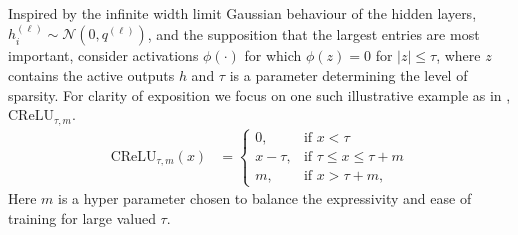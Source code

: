 \documentclass{article}
\theoremstyle{plain}
\theoremstyle{definition}
\theoremstyle{remark}
\begin{document}


Inspired by the infinite width limit Gaussian behaviour of the hidden layers, $h_i^{(\ell)} \sim \mathcal{N} \left( 0, q^{(\ell)} \right)$, and the supposition that the largest entries are most important, consider activations $\phi \left( \cdot \right)$ for which $\phi \left( z \right) = 0$ for $|z| \leq \tau$, where $z$ contains the active outputs $h$ and $\tau$ is a parameter determining the level of sparsity. For clarity of exposition we focus on one such illustrative example as in \cite{price_deep_2023}, $\text{CReLU}_{\tau, m}$. 
\begin{align}
\label{crelu_eq}
            \text{CReLU}_{\tau, m}(x) &=
            \begin{cases}
            0, & \text{if $x<\tau$}\\
            x-\tau, & \text{if $\tau\leq x \leq \tau+m$}\\
            m, & \text{if $x>\tau+m$},
            \end{cases}
\end{align}
Here $m$ is a hyper parameter chosen to balance the expressivity and ease of training for large valued $\tau$. 
\end{document}
